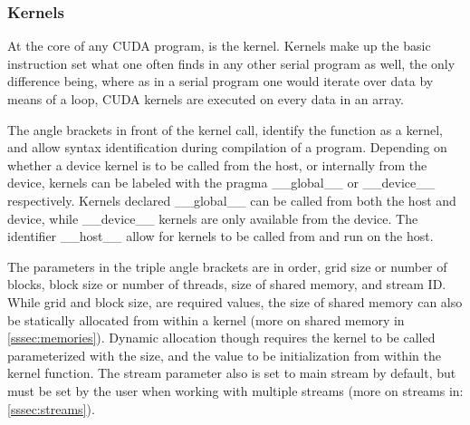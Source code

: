 \subsubsection{Kernels}

At the core of any CUDA program, is the kernel. Kernels make up the basic instruction
set what one often finds in any other serial program as well, the only difference being,
where as in a serial program one would iterate over data by means of a loop,
CUDA kernels are executed on every data in an array.


The angle brackets in front of the kernel call, identify the function as a kernel,
and allow syntax  identification during compilation of a program.  Depending on
whether a device kernel is to be called from the host, or internally from the device,
kernels can be labeled with the pragma \_\_global\_\_ or \_\_device\_\_  respectively.
Kernels declared \_\_global\_\_ can be called from both the host and device, while \_\_device\_\_
kernels are only available from the device. %
The identifier \_\_host\_\_ allow for kernels to be called from and run on the host.

The parameters in the triple angle brackets are in order, grid size or number of blocks,
block size or number of threads, size of shared memory, and stream ID.  While grid and block size,
are required values, the size of shared memory can also be statically allocated from within
a kernel (more on shared memory in \ref{sssec:memories}).  Dynamic allocation though requires the kernel to be called parameterized with
the size, and the value to be initialization from within the kernel function.  The stream
parameter also is set to main stream by default, but must be set by the user when
working with multiple streams (more on streams in: \ref{sssec:streams}).
